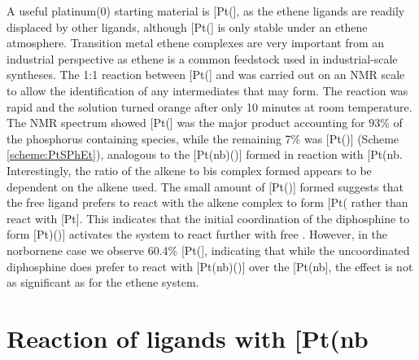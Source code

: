 A useful platinum(0) starting material is [Pt(], as the ethene ligands are readily displaced by other ligands, although [Pt(] is only stable under an ethene atmosphere.\cite{Harrison1978, Howard1983} Transition metal ethene complexes are very important from an industrial perspective as ethene is a common feedstock used in industrial-scale syntheses.\cite{Yoneda2001, Degnan2001}  The 1:1 reaction between [Pt(] and \Phthixantphos{} was carried out on an NMR scale to allow the identification of any intermediates that may form.  The reaction was rapid and the solution turned orange after only 10 minutes at room temperature.  The \phosphorus{} NMR spectrum showed [Pt(\Phthixantphos{}] was the major product accounting for 93\% of the phosphorus containing species, while the remaining 7\% was [Pt(\Phthixantphos)] (Scheme \ref{scheme:PtSPhEt}), analogous to the [Pt(nb)(\Phthixantphos)] formed in reaction with [Pt(nb\ce{)3]}.  Interestingly, the ratio of the alkene to bis complex formed appears to be dependent on the alkene used.  The small amount of [Pt(\Phthixantphos)] formed suggests that the free ligand prefers to react with the alkene complex to form [Pt(\Phthixantphos\ce{)2]} rather than react with [Pt].  This indicates that the initial coordination of the diphosphine to form [Pt)(\Phthixantphos)] activates the system to react further with free \Phthixantphos.  However, in the norbornene case we observe 60.4\% [Pt(\Phthixantphos{}], indicating that while the uncoordinated diphosphine does prefer to react with [Pt(nb)(\Phthixantphos)] over the [Pt(nb], the effect is not as significant as for the ethene system.  

%

\section{Reaction of \tBuxantphos{} ligands with \texorpdfstring{[Pt(nb\ce{)3]}} P}  

